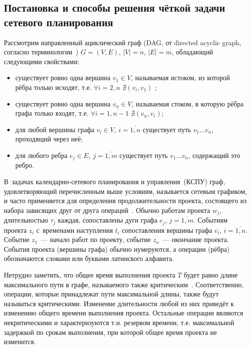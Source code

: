 \subsection{Постановка и способы решения чёткой задачи сетевого планирования}

Рассмотрим направленный ациклический граф (DAG, от directed acyclic graph, согласно терминологии~\cite{Kormen}) $G=(V,E)$, $\left| V \right|=n$, $\left| E \right|=m$, обладающий следующими свойствами:
\begin{itemize}
  \item существует ровно одна вершина $v_1\in V$, называемая истоком, из которой рёбра только исходят, т.е. $\forall i=2,n$ $\nexists \left( v_i, v_1 \right)$ ;
  \item существует ровно одна вершина $v_n\in V$, называемая стоком, в которую рёбра графа только входят, т.е.  $\forall i=\overline{1,n-1}$ $\nexists \left( v_n, v_i \right)$;
  \item для любой вершины графа $v_i\in V,\ i=\overline{1,n}$ существует путь $v_1\ldots v_n$, проходящий через неё;
  \item для любого ребра $e_j\in E,\ j=\overline{1,m}$ существует путь $v_1\ldots v_n$, содержащий это ребро.
\end{itemize}

В~задачах календарно-сетевого планирования и управления~(КСПУ) граф, удовлетворяющий перечисленным выше условиям, называется сетевым графиком, и часто применяется для определения продолжительности проекта, состоящего из набора зависящих друг от друга операций~\cite{Kosorukov_Mischenko, Eddous, Taha_Operation_Research, Balashov_IPU}. Обычно работам проекта $w_j$, длительностью $\tau_j$ каждая, сопоставлены дуги графа $e_j$, $j=\overline{1,m}$. Событиям проекта $z_i$ с~временами наступления $t_i$ сопоставления вершины графа $v_i$, $i=\overline{1,n}$. Событие $z_1$~--- начало работ по проекту, событие $z_n$~--- окончание проекта. События проекта (вершины графа) обычно нумеруются, а операции (рёбра) обозначаются словами или буквами латинского алфавита.

Нетрудно заметить, что общее время выполнения проекта $T$ будет равно длине максимального пути в графе, называемого также критическим~\cite{Burkov}. Соответственно, операции, которые принадлежат пути максимальной длины, также будут называться критическими. Изменение длительности любой из них приведёт к изменению общего времени выполнения проекта. Остальные операции являются некритическими и характеризуются т.н. резервом времени, т.е. максимальной задержкой по срокам выполнения, при которой общее время проекта не изменится.

